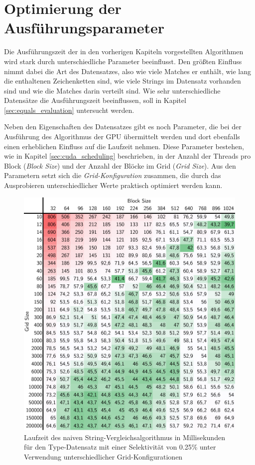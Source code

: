 \chapter{Optimierung der Ausführungsparameter}

Die Ausführungszeit der in den vorherigen Kapiteln vorgestellten Algorithmen wird stark durch unterschiedliche Parameter beeinflusst.
Den größten Einfluss nimmt dabei die Art des Datensatzes, also wie viele Matches er enthält, wie lang die enthaltenen Zeichenketten sind, wie viele Strings im Datensatz vorhanden sind und wie die Matches darin verteilt sind.
Wie sehr unterschiedliche Datensätze die Ausführungszeit beeinflussen, soll in Kapitel \ref{sec:equals_evaluation} untersucht werden.

Neben den Eigenschaften des Datensatzes gibt es noch Parameter, die bei der Ausführung des Algorithmus der GPU übermittelt werden und dort ebenfalls einen erheblichen Einfluss auf die Laufzeit nehmen.
Diese Parameter bestehen, wie in Kapitel \ref{sec:cuda_scheduling} beschrieben, in der Anzahl der Threads pro Block (\emph{Block Size}) und der Anzahl der Blöcke im Grid (\emph{Grid Size}).
Aus den Parametern setzt sich die \emph{Grid-Konfiguration} zusammen, die durch das Ausprobieren unterschiedlicher Werte praktisch optimiert werden kann.

\begin{figure}[]
	\includegraphics[]{bilder/parameter025.pdf}
	\caption{Laufzeit des naiven String-Vergleichsalgorithmus in Millisekunden für den Type-Datensatz mit einer Selektivität von 0.25\% unter Verwendung unterschiedlicher Grid-Konfigurationen}
	\label{parameter025}
\end{figure}

